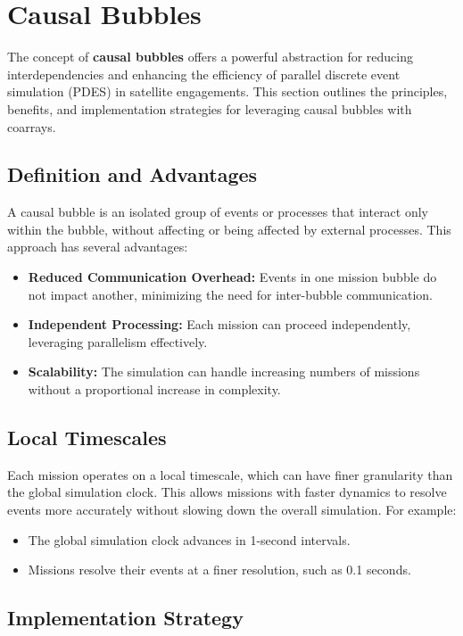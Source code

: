 
\section{Causal Bubbles}

The concept of \textbf{causal bubbles} offers a powerful abstraction for reducing interdependencies and enhancing the efficiency of parallel discrete event simulation (PDES) in satellite engagements. This section outlines the principles, benefits, and implementation strategies for leveraging causal bubbles with coarrays.

\subsection{Definition and Advantages}

A causal bubble is an isolated group of events or processes that interact only within the bubble, without affecting or being affected by external processes. This approach has several advantages:
\begin{itemize}
    \item \textbf{Reduced Communication Overhead:} Events in one mission bubble do not impact another, minimizing the need for inter-bubble communication.
    \item \textbf{Independent Processing:} Each mission can proceed independently, leveraging parallelism effectively.
    \item \textbf{Scalability:} The simulation can handle increasing numbers of missions without a proportional increase in complexity.
\end{itemize}

\subsection{Local Timescales}

Each mission operates on a local timescale, which can have finer granularity than the global simulation clock. This allows missions with faster dynamics to resolve events more accurately without slowing down the overall simulation. For example:
\begin{itemize}
    \item The global simulation clock advances in 1-second intervals.
    \item Missions resolve their events at a finer resolution, such as 0.1 seconds.
\end{itemize}

\subsection{Implementation Strategy}

